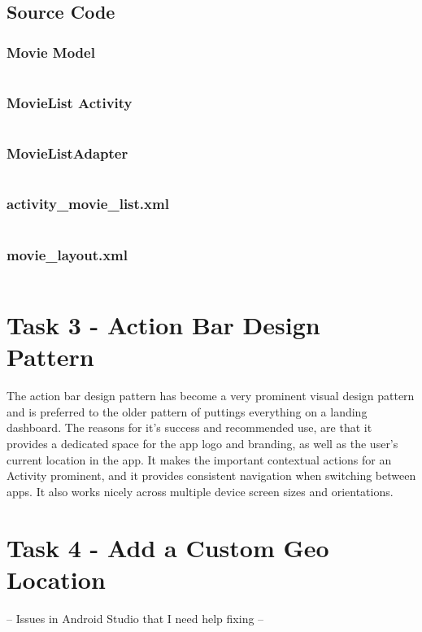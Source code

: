 \documentclass[11pt,english,numbers=endperiod,parskip=half]{scrartcl}
\begin{document}
\begin{landscape}
\subsection{Source Code}
\subsubsection{Movie Model}
\inputminted{java}{../../Apps/Movies/app/src/main/java/au/net/danielparker/movies/Movie.java}

\subsubsection{MovieList Activity}
\inputminted{java}{../../Apps/Movies/app/src/main/java/au/net/danielparker/movies/MovieList.java}

\subsubsection{MovieListAdapter}
\inputminted{java}{../../Apps/Movies/app/src/main/java/au/net/danielparker/movies/MovieListAdapter.java}

\subsubsection{activity\_movie\_list.xml}
\inputminted{xml}{../../Apps/Movies/app/src/main/res/layout/activity_movie_list.xml}

\subsubsection{movie\_layout.xml}
\inputminted{xml}{../../Apps/Movies/app/src/main/res/layout/activity_movie_list.xml}

\end{landscape}


\section{Task 3 - Action Bar Design Pattern}
The action bar design pattern has become a very prominent visual design pattern
and is preferred to the older pattern of puttings everything on a landing dashboard.
The reasons for it's success and recommended use, are that it provides a dedicated
space for the app logo and branding, as well as the user's current location in
the app. It makes the important contextual actions for an Activity prominent,
and it provides consistent navigation when switching between apps. It also works
nicely across multiple device screen sizes and orientations.

\section{Task 4 - Add a Custom Geo Location}
-- Issues in Android Studio that I need help fixing --
\end{document}
